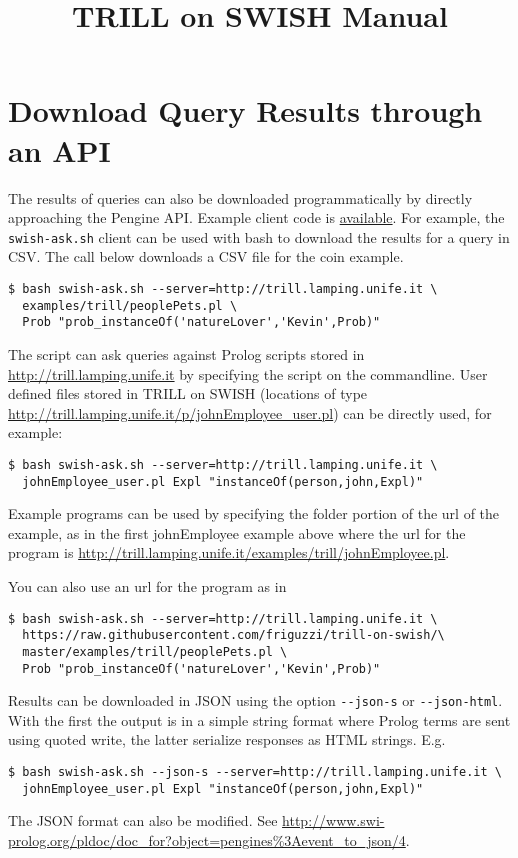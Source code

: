 \documentclass[a4paper,10pt]{scrartcl}
\begin{document}
\title{TRILL on SWISH Manual}
\maketitle







\section{Download Query Results through an API}
The results of queries can also be downloaded programmatically by directly
approaching the Pengine API. Example client code is 
\href{https://github.com/friguzzi/trill-on-swish/tree/master/client}{available}.  For example, the \verb|swish-ask.sh| client
can be used with bash to download the results for a query in CSV.  The call
below downloads a CSV file for the coin example.
\begin{verbatim}
$ bash swish-ask.sh --server=http://trill.lamping.unife.it \
  examples/trill/peoplePets.pl \
  Prob "prob_instanceOf('natureLover','Kevin',Prob)"
\end{verbatim}
The script can ask queries against Prolog scripts stored in 
\url{http://trill.lamping.unife.it} by specifying
the script on the commandline.  User defined files stored
in TRILL on SWISH (locations of type
\url{http://trill.lamping.unife.it/p/johnEmployee_user.pl}) can
be directly used, for example:
\begin{verbatim}
$ bash swish-ask.sh --server=http://trill.lamping.unife.it \
  johnEmployee_user.pl Expl "instanceOf(person,john,Expl)"
\end{verbatim}
Example programs can be used by specifying the folder portion of the url of the example,
as in the first johnEmployee example above where the url for the program is 
\url{http://trill.lamping.unife.it/examples/trill/johnEmployee.pl}.

You can also use an url for the program as in 
\begin{verbatim}
$ bash swish-ask.sh --server=http://trill.lamping.unife.it \
  https://raw.githubusercontent.com/friguzzi/trill-on-swish/\
  master/examples/trill/peoplePets.pl \
  Prob "prob_instanceOf('natureLover','Kevin',Prob)"
\end{verbatim}
Results can be downloaded in JSON using the option \verb|--json-s| or
\verb|--json-html|.
With the first the output is in a simple string format where Prolog terms are sent using quoted write, the latter serialize responses as HTML strings. E.g.
\begin{verbatim}
$ bash swish-ask.sh --json-s --server=http://trill.lamping.unife.it \
  johnEmployee_user.pl Expl "instanceOf(person,john,Expl)"
\end{verbatim}
The JSON format can also be modified. See
\url{http://www.swi-prolog.org/pldoc/doc_for?object=pengines%3Aevent_to_json/4}.
\end{document}
